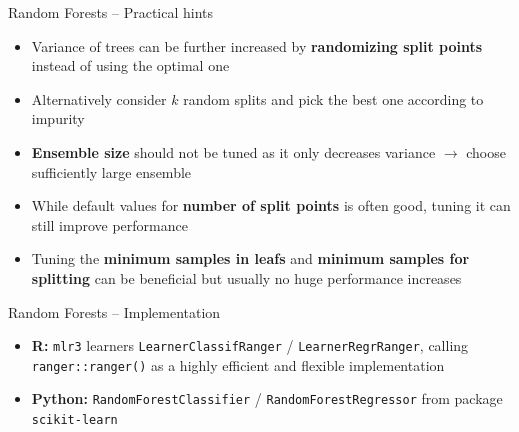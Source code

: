 \begin{frame2}{Random Forests -- Practical hints}
\begin{itemize}
    \item Variance of trees can be further increased by \textbf{randomizing split points} instead of using the optimal one
    \item Alternatively consider $k$ random splits and pick the best one according to impurity 
\end{itemize}



\begin{itemize}
    \item \textbf{Ensemble size} should not be tuned as it only decreases variance $\longrightarrow$ choose sufficiently large ensemble
    \item While default values for \textbf{number of split points} is often good, tuning it can still improve performance
    \item Tuning the \textbf{minimum samples in leafs} and \textbf{minimum samples for splitting} can be beneficial but usually no huge performance increases
\end{itemize}

\end{frame2}

\begin{frame2}{Random Forests -- Implementation}


\begin{itemize}
  \item \textbf{R:} \texttt{mlr3} learners \texttt{LearnerClassifRanger} / 
    \texttt{LearnerRegrRanger}, calling \texttt{ranger::ranger()} as a highly efficient and flexible implementation
  \item \textbf{Python:} \texttt{RandomForestClassifier} / 
  \texttt{RandomForestRegressor} from package \texttt{scikit-learn}
\end{itemize}
\end{frame2}

